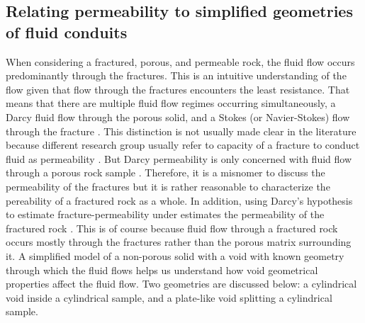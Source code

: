 \documentclass{edger}
\begin{document}
\subsection{Relating permeability to simplified geometries of fluid conduits}
When considering a fractured, porous, and permeable rock, the fluid flow occurs predominantly through the fractures. This is an intuitive understanding of the flow given that flow through the fractures encounters the least resistance. That means that there are multiple fluid flow regimes occurring simultaneously, a Darcy fluid flow through the porous solid, and a Stokes (or Navier-Stokes) flow through the fracture . This distinction is not usually made clear in the literature because different research group usually refer to capacity of a fracture to conduct fluid as permeability \citep[p. 6]{Orangi2011} . But Darcy permeability is only concerned with fluid flow through a porous rock sample . Therefore, it is a misnomer to discuss the permeability of the fractures but it is rather reasonable to characterize the pereability of a fractured rock as a whole. In addition, using Darcy's hypothesis to estimate fracture-permeability under estimates the permeability of the fractured rock \citep{Singh2019}. This is of course because fluid flow through a fractured rock occurs mostly through the fractures rather than the porous matrix surrounding it. A simplified model of a non-porous solid with a void with known geometry through which the fluid flows helps us understand how void geometrical properties affect the fluid flow. Two geometries are discussed below: a cylindrical void inside a cylindrical sample, and a plate-like void splitting a cylindrical sample.
\end{document}
